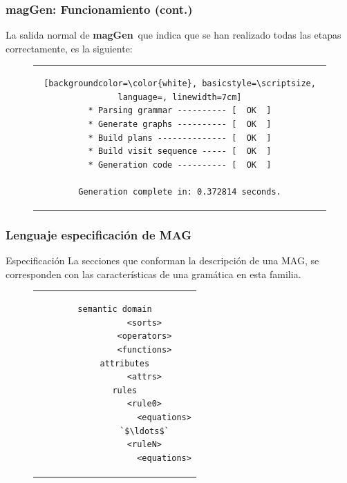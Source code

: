 \documentclass[10pt]{beamer}
\newcommand{\maggen}{\textbf{magGen}}
\begin{document}
\begin{frame}[fragile]
    \frametitle{\maggen: Funcionamiento (cont.)}

    La salida normal de \maggen\ que indica que se han realizado todas las etapas correctamente, es la siguiente:

\begin{figure}[h]
\begin{center}
\begin{tabular}{c}
\begin{lstlisting}[backgroundcolor=\color{white}, basicstyle=\scriptsize, language=, linewidth=7cm]
* Parsing grammar ---------- [  OK  ]
* Generate graphs ---------- [  OK  ]
* Build plans -------------- [  OK  ]
* Build visit sequence ----- [  OK  ]
* Generation code ---------- [  OK  ]

Generation complete in: 0.372814 seconds.
\end{lstlisting}
\end{tabular}
\end{center}
\end{figure}
\end{frame}

\begin{frame}[fragile]
    \frametitle{Lenguaje especificación de MAG}

    \begin{block}{Especificación}
    La secciones que conforman la descripción de una MAG, se corresponden con las características de una gramática en esta familia.
    \end{block}
    
\begin{figure}[h]
\begin{center}
\begin{tabular}{c}
 \begin{lstlisting}[language=specmag, basicstyle=\small, linewidth=7cm]
    semantic domain
            <sorts>
            <operators>
            <functions>
    attributes
            <attrs>
    rules
            <rule0>
                    <equations>
            `$\ldots$`
            <ruleN>
                    <equations>
\end{lstlisting} 
\end{tabular}
\end{center}
\end{figure}
\end{frame}
\end{document}
